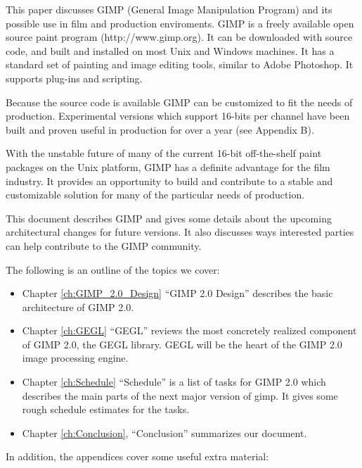 This paper discusses GIMP (General Image Manipulation Program) and its possible
use in film and production enviroments. GIMP is a freely available open source
paint program (http://www.gimp.org). It can be downloaded with source code, and
built and installed on most Unix and Windows machines. It has a standard set of
painting and image editing tools, similar to Adobe Photoshop. It supports
plug-ins and scripting.

Because the source code is available GIMP can be customized to fit the needs of
production. Experimental versions which support 16-bits per channel have been
built and proven useful in production for over a year (see Appendix B).

With the unstable future of many of the current 16-bit off-the-shelf paint
packages on the Unix platform, GIMP has a definite advantage for the film
industry. It provides an opportunity to build and contribute to a stable and
customizable solution for many of the particular needs of production. 

This document describes GIMP and gives some details about the upcoming
architectural changes for future versions. It also discusses ways interested
parties can help contribute to the GIMP community.  

The following is an outline of the topics we cover:

\begin{itemize}

\item Chapter \ref{ch:GIMP_2.0_Design} ``GIMP 2.0 Design'' describes 
the basic architecture of GIMP 2.0.

\item Chapter \ref{ch:GEGL} ``GEGL'' reviews the most concretely realized 
component of GIMP 2.0, the GEGL library. GEGL will be the heart of
the GIMP 2.0 image processing engine.

\item Chapter \ref{ch:Schedule} ``Schedule'' is a list of tasks for GIMP 2.0
which describes the main parts of the next major version of gimp. It gives some
rough schedule estimates for the tasks.  

\item Chapter \ref{ch:Conclusion}, ``Conclusion'' summarizes our document. 

\end{itemize}

In addition, the appendices cover some useful extra material:

